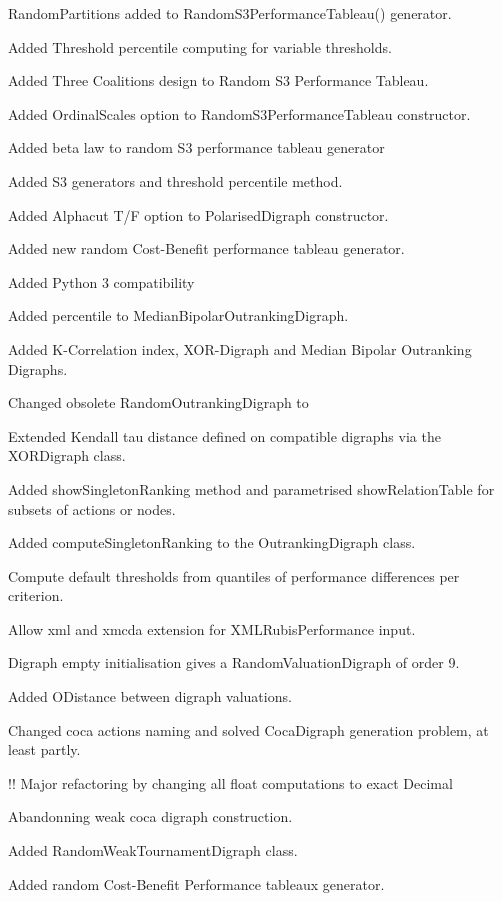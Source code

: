 \documentclass{article}
\newcommand{\+}{\verb+}
\renewcommand{\*}{\back{}}
\begin{document}
\begin{center}
\begin{menu}
\item RandomPartitions added to RandomS3PerformanceTableau() generator.
\item Added Threshold percentile computing for variable thresholds.
\item Added Three Coalitions design to Random S3 Performance Tableau.
\item Added OrdinalScales option to RandomS3PerformanceTableau constructor.
\item Added beta law to random S3 performance tableau generator
\item Added S3 generators and threshold percentile method.
\item Added Alphacut T/F option to PolarisedDigraph constructor.
\item Added new random Cost-Benefit performance tableau generator.
\item Added Python 3 compatibility
\item Added percentile to MedianBipolarOutrankingDigraph.
\item Added K-Correlation index, XOR-Digraph and Median Bipolar Outranking Digraphs.
\item Changed obsolete RandomOutrankingDigraph to
\item Extended Kendall tau distance defined on compatible digraphs via the XORDigraph class.
\item Added showSingletonRanking method and parametrised showRelationTable for subsets of actions or nodes.
\item Added computeSingletonRanking to the OutrankingDigraph class.
\item Compute default thresholds from quantiles of performance differences per criterion.
\item Allow xml and xmcda extension for XMLRubisPerformance input.
\item Digraph empty initialisation gives a RandomValuationDigraph of order 9.
\item Added ODistance between digraph valuations.
\item Changed coca actions naming and solved CocaDigraph generation problem, at least partly.
\item !! Major refactoring by changing all float computations to exact Decimal
\item Abandonning weak coca digraph construction.
\item Added RandomWeakTournamentDigraph class.
\item Added random Cost-Benefit Performance tableaux generator.

\end{menu}
\end{center}
\end{document}
